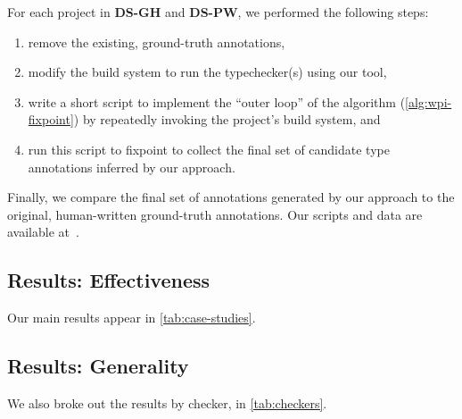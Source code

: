 For each project in \textbf{DS-GH} and \textbf{DS-PW}, we performed the following steps:
\begin{enumerate}
\item remove the existing, ground-truth annotations,
\item modify the build system to run the typechecker(s) using our
  tool,%
\item write a short script to implement the ``outer loop'' of the algorithm
  (\ie \cref{alg:wpi-fixpoint}) by repeatedly invoking the project's build
  system,%
    and
\item run this script to fixpoint to collect the final set of candidate type annotations
  inferred by our approach.
\end{enumerate}

Finally, we compare the final set of annotations generated by our approach to the original,
human-written ground-truth annotations. Our scripts and data are available
at~.

\subsection{Results: Effectiveness}
\label{sec:results}

Our main results appear in \cref{tab:case-studies}. 

\subsection{Results: Generality}
\label{sec:by-checker}



We also broke out the results by checker, in \cref{tab:checkers}. 



